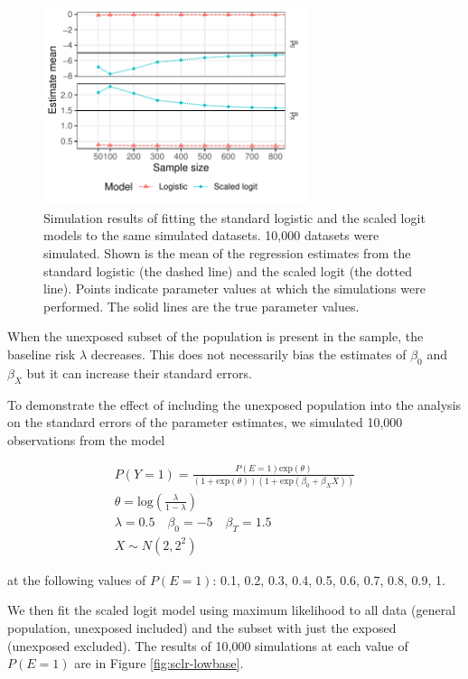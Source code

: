 \begin{figure}[htp]
	\centering
	\includegraphics[width=0.69\textwidth]{../logistic-plot/vary_nsam_mean.pdf}
	\caption{
		Simulation results of fitting the standard logistic and the scaled logit models to the same simulated datasets. 10,000 datasets were simulated. Shown is the mean of the regression estimates from the standard logistic (the dashed line) and the scaled logit (the dotted line). Points indicate parameter values at which the simulations were performed. The solid lines are the true parameter values.
	}
	\label{SclrMean}
\end{figure}

When the unexposed subset of the population is present in the sample, the baseline risk $\lambda$ decreases. This does not necessarily bias the estimates of $\beta_0$ and $\beta_X$ but it can increase their standard errors.

To demonstrate the effect of including the unexposed population into the analysis on the standard errors of the parameter estimates, we simulated 10,000 observations from the model

\[
	\begin{gathered}
		P(Y=1) = \frac{P(E=1)\text{exp}(\theta)}{(1+\text{exp}(\theta))(1+\text{exp}(\beta_0+\beta_X X))} \\
		\theta = \text{log}(\frac{\lambda}{1-\lambda}) \\
		\lambda = 0.5 \quad \beta_0 = -5 \quad \beta_T = 1.5 \\
		X \sim N(2, 2^2)
	\end{gathered}
\]

at the following values of \(P(E=1)\): 0.1, 0.2, 0.3, 0.4, 0.5, 0.6, 0.7, 0.8, 0.9, 1.

We then fit the scaled logit model using maximum likelihood to all data (general population, unexposed included) and the subset with just the exposed (unexposed excluded). The results of 10,000 simulations at each value of \(P(E=1)\) are in Figure \ref{fig:sclr-lowbase}.

